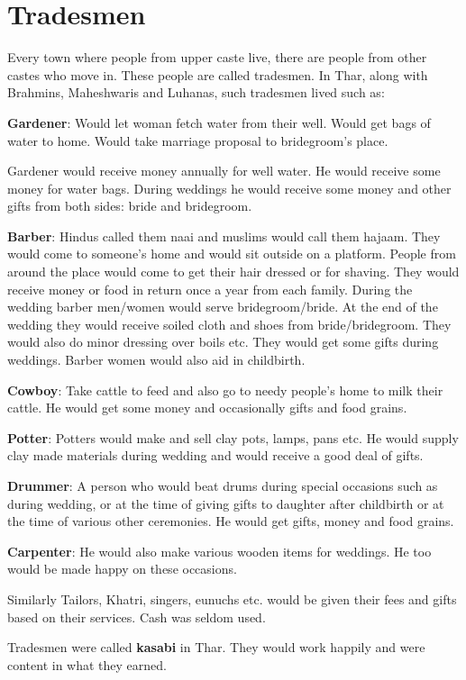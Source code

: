 \chapter{Tradesmen}
Every town where people from upper caste live, there are people from other
castes who move in. These people are called tradesmen. In Thar, along with
Brahmins, Maheshwaris and Luhanas, such tradesmen lived such as:

\textbf{Gardener}: Would let woman fetch water from their well. Would get bags
of water to home. Would take marriage proposal to bridegroom's place.

Gardener would receive money annually for well water. He would receive some
money for water bags. During weddings he would receive some money and other
gifts from both sides: bride and bridegroom.

\textbf{Barber}: Hindus called them naai and muslims would call them hajaam.
They would come to someone's home and would sit outside on a platform. People
from around the place would come to get their hair dressed or for shaving. They
would receive money or food in return once a year from each family. During the
wedding barber men/women would serve bridegroom/bride. At the end of the wedding
they would receive soiled cloth and shoes from bride/bridegroom. They would also do
minor dressing over boils etc. They would get some gifts during weddings.
Barber women would also aid in childbirth.

\textbf{Cowboy}: Take cattle to feed and also go to needy people's home to milk
their cattle. He would get some money and occasionally gifts and food grains.

\textbf{Potter}: Potters would make and sell clay pots, lamps, pans etc. He
would supply clay made materials during wedding and would receive a good deal
of gifts.

\textbf{Drummer}: A person who would beat drums during special occasions such
as during wedding, or at the time of giving gifts to daughter after childbirth
or at the time of various other ceremonies. He would get gifts, money and food
grains.

\textbf{Carpenter}: He would also make various wooden items for weddings. He
too would be made happy on these occasions.

Similarly Tailors, Khatri, singers, eunuchs etc. would be given their fees and
gifts based on their services. Cash was seldom used.

Tradesmen were called \textbf{kasabi} in Thar. They would work happily and were
content in what they earned.

